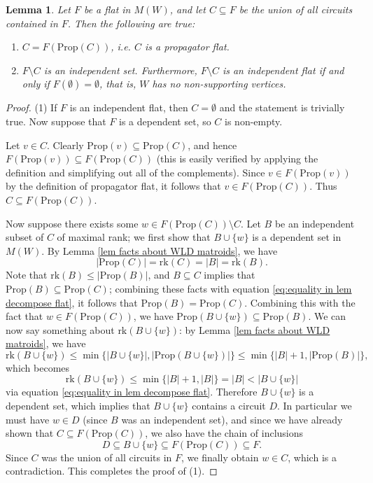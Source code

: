 \documentclass[11pt]{article}
\newcommand{\rk}{\textrm{rk} }
\newcommand{\Prop}{\textrm{Prop}}
\newtheorem{lem}[thm]{Lemma}
\theoremstyle{remark}
\theoremstyle{definition}
\begin{document}
\begin{lem} \label{lem decompose flat}Let $F$ be a flat in $M(W)$, and let $C \subseteq F$ be the union of all circuits contained in $F$. Then the following are true:
\begin{enumerate}
\item $C = F(\Prop (C))$, i.e. $C$ is a propagator flat.
\item $F \setminus C$ is an independent set. Furthermore, $F\setminus C$ is an independent flat if and only if $F(\emptyset) = \emptyset$, that is, $W$ has no non-supporting vertices.  
\end{enumerate}
\end{lem}

\begin{proof}
(1) If $F$ is an independent flat, then $C = \emptyset$ and the statement is trivially true. Now suppose that $F$ is a dependent set, so $C$ is non-empty.

Let $v \in C$. Clearly $\Prop(v) \subseteq \Prop(C)$, and hence $F(\Prop(v)) \subseteq F(\Prop(C))$ (this is easily verified by applying the definition and simplifying out all of the complements). Since $v \in F(\Prop(v))$ by the definition of propagator flat, it follows that $v \in F(\Prop(C))$. Thus $C \subseteq F(\Prop(C))$.

Now suppose there exists some $w \in  F(\Prop(C)) \setminus C$. Let $B$ be an independent subset of $C$ of maximal rank; we first show that $B \cup \{w\}$ is a dependent set in $M(W)$. By Lemma \ref{lem facts about WLD matroids}, we have
\begin{equation}\label{eq:equality in lem decompose flat} |\Prop(C)| = \rk(C) = |B| = \rk(B) .\end{equation}
Note that $\rk(B) \leq |\Prop(B)|$, and $B \subseteq C$ implies that $\Prop(B) \subseteq \Prop(C)$; combining these facts with equation \eqref{eq:equality in lem decompose flat}, it follows that $\Prop(B) = \Prop(C)$. Combining this with the fact that $w \in F(\Prop(C))$, we have $\Prop(B\cup \{w\}) \subseteq \Prop(B)$. We can now say something about $\rk(B\cup \{w\})$: by Lemma \ref{lem facts about WLD matroids}, we have 
\[
\rk (B \cup \{w\}) \leq \min\{|B\cup \{w\}|, |\Prop(B\cup \{w\})|\} \leq \min\{|B|+1,|\Prop(B)|\},
\]
which becomes 
\[\rk(B\cup \{w\}) \leq \min\{|B|+1,|B|\} = |B| < |B \cup\{w\}|\]
via equation \eqref{eq:equality in lem decompose flat}. Therefore $B\cup\{w\}$ is a dependent set, which implies that $B\cup \{w\}$ contains a circuit $D$. In particular we must have $w \in D$ (since $B$ was an independent set), and since we have already shown that $C \subseteq F(\Prop(C))$, we also have the chain of inclusions 
\[D \subseteq B\cup \{w\} \subseteq F(\Prop(C)) \subseteq F.\]
Since $C$ was the union of all circuits in $F$, we finally obtain $w \in C$, which is a contradiction. This completes the proof of (1).



\end{proof}
\end{document}
